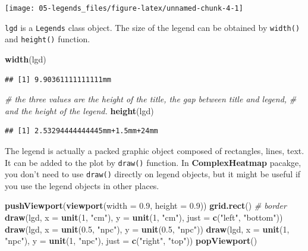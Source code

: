 \documentclass[]{book}
\newenvironment{Shaded}{\begin{snugshade}}{\end{snugshade}}
\newcommand{\KeywordTok}[1]{\textcolor[rgb]{0.13,0.29,0.53}{\textbf{#1}}}
\newcommand{\DataTypeTok}[1]{\textcolor[rgb]{0.13,0.29,0.53}{#1}}
\newcommand{\DecValTok}[1]{\textcolor[rgb]{0.00,0.00,0.81}{#1}}
\newcommand{\FloatTok}[1]{\textcolor[rgb]{0.00,0.00,0.81}{#1}}
\newcommand{\StringTok}[1]{\textcolor[rgb]{0.31,0.60,0.02}{#1}}
\newcommand{\CommentTok}[1]{\textcolor[rgb]{0.56,0.35,0.01}{\textit{#1}}}
\newcommand{\NormalTok}[1]{#1}
\theoremstyle{definition}
\theoremstyle{definition}
\theoremstyle{definition}
\theoremstyle{remark}
\begin{document}
\begin{center}\texttt{[image: 05-legends\_files/figure-latex/unnamed-chunk-4-1]} \end{center}

\texttt{lgd} is a \texttt{Legends} class object. The size of the legend
can be obtained by \texttt{width()} and \texttt{height()} function.

\begin{Shaded}
\begin{Highlighting}[]
\KeywordTok{width}\NormalTok{(lgd)}
\end{Highlighting}
\end{Shaded}

\begin{verbatim}
## [1] 9.90361111111111mm
\end{verbatim}

\begin{Shaded}
\begin{Highlighting}[]
\CommentTok{# the three values are the height of the title, the gap between title and legend, }
\CommentTok{# and the height of the legend. }
\KeywordTok{height}\NormalTok{(lgd)}
\end{Highlighting}
\end{Shaded}

\begin{verbatim}
## [1] 2.53294444444445mm+1.5mm+24mm
\end{verbatim}

The legend is actually a packed graphic object composed of rectangles,
lines, text. It can be added to the plot by \texttt{draw()} function. In
\textbf{ComplexHeatmap} pacakge, you don't need to use \texttt{draw()}
directly on legend objects, but it might be useful if you use the legend
objects in other places.

\begin{Shaded}
\begin{Highlighting}[]
\KeywordTok{pushViewport}\NormalTok{(}\KeywordTok{viewport}\NormalTok{(}\DataTypeTok{width =} \FloatTok{0.9}\NormalTok{, }\DataTypeTok{height =} \FloatTok{0.9}\NormalTok{))}
\KeywordTok{grid.rect}\NormalTok{()  }\CommentTok{# border}
\KeywordTok{draw}\NormalTok{(lgd, }\DataTypeTok{x =} \KeywordTok{unit}\NormalTok{(}\DecValTok{1}\NormalTok{, }\StringTok{"cm"}\NormalTok{), }\DataTypeTok{y =} \KeywordTok{unit}\NormalTok{(}\DecValTok{1}\NormalTok{, }\StringTok{"cm"}\NormalTok{), }\DataTypeTok{just =} \KeywordTok{c}\NormalTok{(}\StringTok{"left"}\NormalTok{, }\StringTok{"bottom"}\NormalTok{))}
\KeywordTok{draw}\NormalTok{(lgd, }\DataTypeTok{x =} \KeywordTok{unit}\NormalTok{(}\FloatTok{0.5}\NormalTok{, }\StringTok{"npc"}\NormalTok{), }\DataTypeTok{y =} \KeywordTok{unit}\NormalTok{(}\FloatTok{0.5}\NormalTok{, }\StringTok{"npc"}\NormalTok{))}
\KeywordTok{draw}\NormalTok{(lgd, }\DataTypeTok{x =} \KeywordTok{unit}\NormalTok{(}\DecValTok{1}\NormalTok{, }\StringTok{"npc"}\NormalTok{), }\DataTypeTok{y =} \KeywordTok{unit}\NormalTok{(}\DecValTok{1}\NormalTok{, }\StringTok{"npc"}\NormalTok{), }\DataTypeTok{just =} \KeywordTok{c}\NormalTok{(}\StringTok{"right"}\NormalTok{, }\StringTok{"top"}\NormalTok{))}
\KeywordTok{popViewport}\NormalTok{()}
\end{Highlighting}
\end{Shaded}
\end{document}
